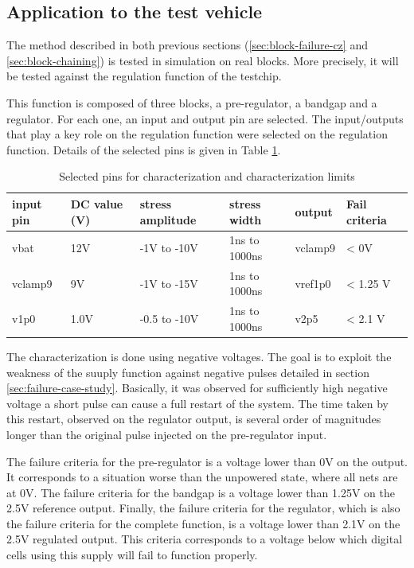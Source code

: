 \subsection{Application to the test vehicle}
\label{sec:application-test-vehicle}

The method described in both previous sections (\ref{sec:block-failure-cz} and \ref{sec:block-chaining}) is tested in simulation on real blocks.
More precisely, it will be tested against the regulation function of the testchip.

This function is composed of three blocks, a pre-regulator, a bandgap and a regulator.
For each one, an input and output pin are selected.
The input/outputs that play a key role on the regulation function were selected on the regulation function.
Details of the selected pins is given in Table \ref{selected-pins-for-cz}.

\begin{table}[!htbp]
\centering
\begin{tabular}{@{}llllll@{}}
\toprule
input pin       &  DC value (V) & stress amplitude   &  stress width   &   output      & Fail criteria \\ \midrule
vbat            &  12V          & -1V to -10V        &  1ns to 1000ns  &   vclamp9     & < 0V             \\
vclamp9         &  9V           & -1V to -15V        &  1ns to 1000ns  &   vref1p0     & < 1.25 V         \\
v1p0            &  1.0V         & -0.5 to -10V       &  1ns to 1000ns  &   v2p5        & < 2.1 V          \\
\bottomrule
\end{tabular}
\caption{Selected pins for characterization and characterization limits}
\label{selected-pins-for-cz}
\end{table}

The characterization is done using negative voltages.
The goal is to exploit the weakness of the suuply function against negative pulses detailed in section \ref{sec:failure-case-study}.
Basically, it was observed for sufficiently high negative voltage a short pulse can cause a full restart of the system.
The time taken by this restart, observed on the regulator output, is several order of magnitudes longer than the original pulse injected on the pre-regulator input.

The failure criteria for the pre-regulator is a voltage lower than 0V on the output.
It corresponds to a situation worse than the unpowered state, where all nets are at 0V.
The failure criteria for the bandgap is a voltage lower than 1.25V on the 2.5V reference output.
Finally, the failure criteria for the regulator, which is also the failure criteria for the complete function, is a voltage lower than 2.1V on the 2.5V regulated output.
This criteria corresponds to a voltage below which digital cells using this supply will fail to function properly.

